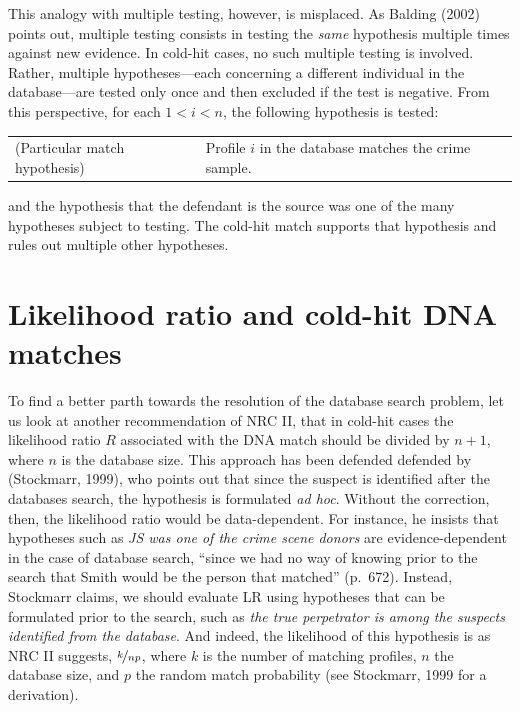 \documentclass[10pt,dvipsnames,enabledeprecatedfontcommands]{scrartcl}
\begin{document}
This analogy with multiple testing, however, is misplaced. As Balding
(2002) points out, multiple testing consists in testing the
\textit{same} hypothesis multiple times against new evidence. In
cold-hit cases, no such multiple testing is involved. Rather, multiple
hypotheses---each concerning a different individual in the
database---are tested only once and then excluded if the test is
negative. From this perspective, for each \(1 < i <n\), the following
hypothesis is tested: \vspace{1mm}

\begin{tabular}{lp{8cm}}
(Particular match hypothesis) &
Profile $i$ in the database matches the crime sample.
\end{tabular}

\vspace{1mm} \noindent and the hypothesis that the defendant is the
source was one of the many hypotheses subject to testing. The cold-hit
match supports that hypothesis and rules out multiple other hypotheses.

\section{\texorpdfstring{Likelihood ratio and cold-hit DNA matches
\label{sec:cold-hit}}{Likelihood ratio and cold-hit DNA matches }}\label{likelihood-ratio-and-cold-hit-dna-matches}

To find a better parth towards the resolution of the database search
problem, let us look at another recommendation of NRC II, that in
cold-hit cases the likelihood ratio \(R\) associated with the DNA match
should be divided by \(n+1\), where \(n\) is the database size. This
approach has been defended defended by (Stockmarr, 1999), who points out
that since the suspect is identified after the databases search, the
hypothesis is formulated \textit{ad hoc}. Without the correction, then,
the likelihood ratio would be data-dependent. For instance, he insists
that hypotheses such as \emph{JS was one of the crime scene donors} are
evidence-dependent in the case of database search, ``since we had no way
of knowing prior to the search that Smith would be the person that
matched'' (p.~672). Instead, Stockmarr claims, we should evaluate LR
using hypotheses that can be formulated prior to the search, such as
\emph{the true perpetrator is among the suspects identified from the database}.
And indeed, the likelihood of this hypothesis is as NRC II suggests,
\(\nicefrac{k}{np}\), where \(k\) is the number of matching profiles,
\(n\) the database size, and \(p\) the random match probability (see
Stockmarr, 1999 for a derivation).
\end{document}

